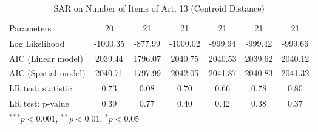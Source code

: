 \begin{table}[!h]
\begin{center}
\begin{tabular}{l c c c c c c }
Parameters              & 20           & 21           & 21           & 21           & 21           & 21           \\
Log Likelihood          & -1000.35     & -877.99      & -1000.02     & -999.94      & -999.42      & -999.66      \\
AIC (Linear model)      & 2039.44      & 1796.07      & 2040.75      & 2040.53      & 2039.62      & 2040.12      \\
AIC (Spatial model)     & 2040.71      & 1797.99      & 2042.05      & 2041.87      & 2040.83      & 2041.32      \\
LR test: statistic      & 0.73         & 0.08         & 0.70         & 0.66         & 0.78         & 0.80         \\
LR test: p-value        & 0.39         & 0.77         & 0.40         & 0.42         & 0.38         & 0.37         \\
\bottomrule
\multicolumn{7}{l}{\scriptsize{$^{***}p<0.001$, $^{**}p<0.01$, $^*p<0.05$}}
\end{tabular}
\caption{SAR on Number of Items of Art. 13 (Centroid Distance)}
\label{table:coefficients}
\end{center}
\end{table}
